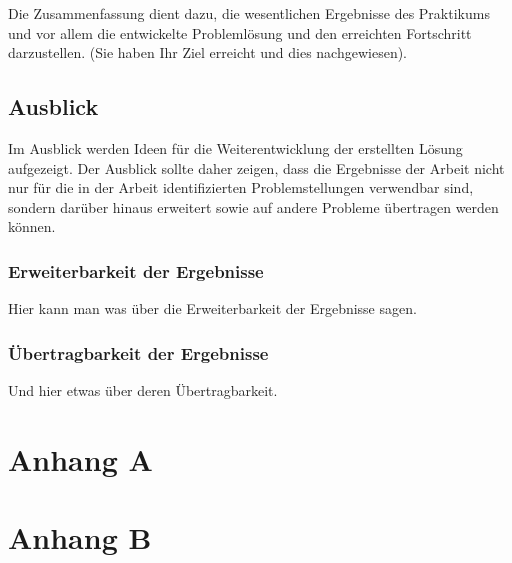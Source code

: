 \documentclass[oneside]{ausarbeitung}
\begin{document}
Die Zusammenfassung dient dazu, die wesentlichen Ergebnisse des 
Praktikums und vor allem die entwickelte Problemlösung und den 
erreichten Fortschritt darzustellen. (Sie haben Ihr Ziel erreicht und 
dies nachgewiesen).

\section{Ausblick}
\label{sec:ausblick}

Im Ausblick werden Ideen für die Weiterentwicklung der erstellten Lösung 
aufgezeigt. Der Ausblick sollte daher zeigen, dass die Ergebnisse der 
Arbeit nicht nur für die in der Arbeit identifizierten Problemstellungen 
verwendbar sind, sondern darüber hinaus erweitert sowie auf andere 
Probleme übertragen werden können.

\subsection{Erweiterbarkeit der Ergebnisse}
\label{sub:erweiterbarkeit}

Hier kann man was über die Erweiterbarkeit der Ergebnisse sagen.

\subsection{Übertragbarkeit der Ergebnisse}
\label{sub:uebertragbarkeit}

Und hier etwas über deren Übertragbarkeit.

\appendix

\printbibliography[heading=bibintoc]

\chapter{Anhang A}

\chapter{Anhang B}
\end{document}
